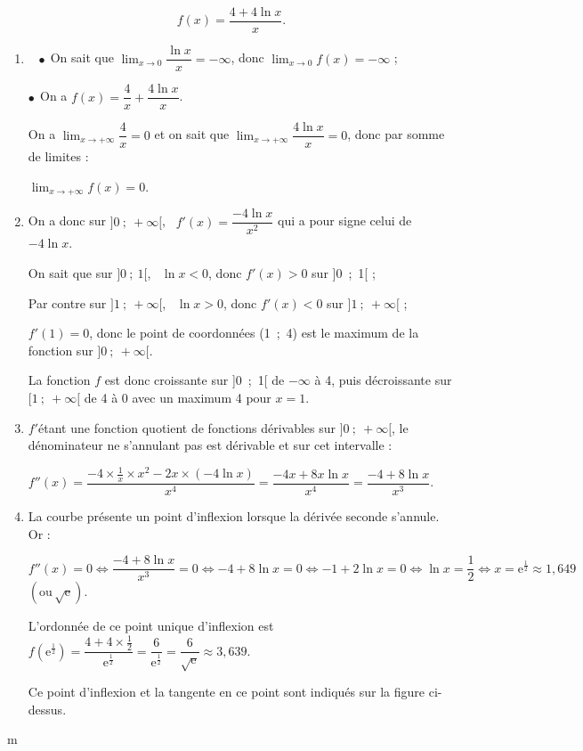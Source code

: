 \[f(x) = \dfrac{4 + 4\ln x}{x}.\]

\begin{enumerate}[resume]
\item ~
$\bullet~~$On sait que $\displaystyle\lim_{x \to 0} \dfrac{\ln x}{x} = - \infty$, donc 
$\displaystyle\lim_{x \to 0} f(x) = - \infty$ ;

$\bullet~~$On a $f(x) = \dfrac{4}{x} + \dfrac{4\ln x}{x}$.

On a $\displaystyle\lim_{x \to + \infty}\dfrac{4}{x} = 0$ et on sait que $\displaystyle\lim_{x \to + \infty}\dfrac{4\ln x}{x} = 0$, donc par somme de limites : 

$\displaystyle\lim_{x \to + \infty}f(x) = 0$.
\item 
On a donc sur $]0~;~+ \infty[$, \, $f'(x) = \dfrac{-4\ln x}{x^2}$ qui a pour signe celui de $-4\ln x$.

On sait que sur $]0~;~1[$, \, $\ln x < 0$, donc $f'(x) > 0$ sur ]0~;~1[ ;

Par contre sur $]1~;~+ \infty[$, \, $\ln x > 0$, donc $f'(x) < 0$ sur $]1~;~+ \infty[$ ;

$f'(1) = 0$, donc le point de coordonnées (1~;~4) est le maximum de la fonction sur $]0~;~+ \infty[$.

La fonction $f$ est donc croissante sur ]0~;~1[ de $- \infty$ à 4, puis décroissante sur $[1~;~+ \infty[$ de 4 à 0 avec un maximum 4 pour $x = 1$.
\item 
$f'$étant une fonction quotient de fonctions dérivables sur $]0~;~+ \infty[$, le dénominateur ne s'annulant pas est dérivable et sur cet intervalle :

$f''(x) = \dfrac{-4 \times \frac{1}{x} \times x^2 - 2x \times (- 4\ln x)}{x^4} = \dfrac{- 4x + 8x\ln x}{x^4} = \dfrac{- 4 + 8\ln x}{x^3}.$

\item 
La courbe présente un point d'inflexion lorsque la dérivée seconde s'annule. Or :

$f''(x) = 0 \iff \dfrac{- 4 + 8\ln x}{x^3} = 0 \iff - 4 + 8\ln x = 0 \iff -1 + 2\ln x= 0 \iff \ln x= \dfrac{1}{2} \iff x = \text{e}^{\frac{1}{2}} \approx 1,649$ $\left(\text{ou}\, \sqrt{\text{e}} \right)$.

L'ordonnée de ce point unique d'inflexion est $f\left(\text{e}^{\frac{1}{2}}\right) = \dfrac{4 + 4\times \frac{1}{2}}{\text{e}^{\frac{1}{2}}} = \dfrac{6}{\text{e}^{\frac{1}{2}}} = \dfrac{6} {\sqrt{\text{e}}} \approx 3,639$.

Ce point d'inflexion et la tangente en ce point sont indiqués sur la figure ci-dessus.
\end{enumerate}

\begin{center}{\fontsize{18}{18}\selectfont m} 


\end{center}
